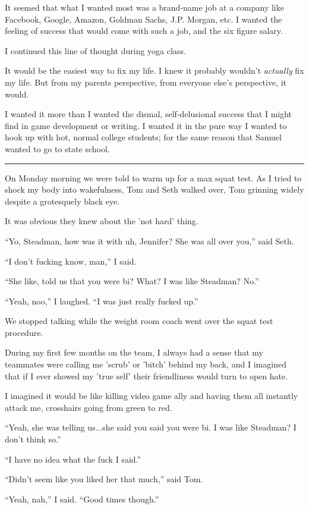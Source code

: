 It seemed that what I wanted most was a brand-name job at a company like
Facebook, Google, Amazon, Goldman Sachs, J.P.  Morgan, etc.  I wanted the
feeling of success that would come with such a job, and the six figure salary.

I continued this line of thought during yoga class.

It would be the easiest way to fix my life.  I knew it probably wouldn't
\textit{actually} fix my life.  But from my parents perspective, from everyone
else's perspective, it would.  

I wanted it more than I wanted the dismal, self-delusional success that I might
find in game development or writing.  I wanted it in the pure way I wanted to
hook up with hot, normal college students; for the same reason that Samuel
wanted to go to state school. 

\plainfancybreak{12pt}{2}{}

On Monday morning we were told to warm up for a max squat test.  As I tried to
shock my body into wakefulness, Tom and Seth walked over, Tom grinning widely
despite a grotesquely black eye.  

It was obvious they knew about the 'not hard' thing.

``Yo, Steadman, how was it with uh, Jennifer?  She was all over you,'' said
Seth.

``I don't fucking know, man,'' I said.

``She like, told us that you were bi?  What?  I was like Steadman?  No.''

``Yeah, noo,'' I laughed. ``I was just really fucked up.''

We stopped talking while the weight room coach went over the squat test
procedure.

During my first few months on the team, I always had a sense that my teammates
were calling me 'scrub' or 'bitch' behind my back, and I imagined that if I ever
showed my 'true self' their friendliness would turn to open hate. 

I imagined it would be like killing video game ally and having them all
instantly attack me, crosshairs going from green to red.  

``Yeah, she was telling us...she said you said you were bi.  I was like
Steadman?  I don't think so.''

``I have no idea what the fuck I said.''

``Didn't seem like you liked her that much,'' said Tom.

``Yeah, nah,'' I said.  ``Good times though.''


